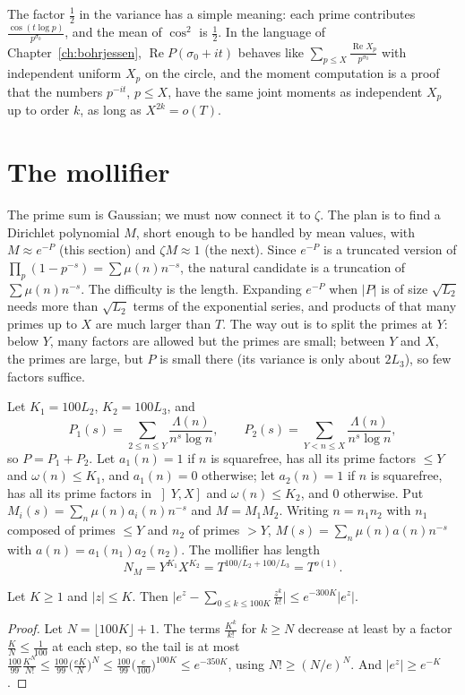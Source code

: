 The factor $\frac12$ in the variance has a simple meaning: each prime contributes $\frac{\cos(t\log p)}{p^{\sigma_0}}$, and the mean of $\cos^2$ is $\frac12$. In the language of Chapter~\ref{ch:bohrjessen}, $\operatorname{Re}P(\sigma_0+it)$ behaves like $\sum_{p\le X}\frac{\operatorname{Re}X_p}{p^{\sigma_0}}$ with independent uniform $X_p$ on the circle, and the moment computation is a proof that the numbers $p^{-it}$, $p\le X$, have the same joint moments as independent $X_p$ up to order $k$, as long as $X^{2k}=o(T)$.

\section{The mollifier}

The prime sum is Gaussian; we must now connect it to $\zeta$. The plan is to find a Dirichlet polynomial $M$, short enough to be handled by mean values, with $M\approx e^{-P}$ (this section) and $\zeta M\approx1$ (the next). Since $e^{-P}$ is a truncated version of $\prod_p(1-p^{-s})=\sum\mu(n)n^{-s}$, the natural candidate is a truncation of $\sum\mu(n)n^{-s}$. The difficulty is the length. Expanding $e^{-P}$ when $|P|$ is of size $\sqrt{L_2}$ needs more than $\sqrt{L_2}$ terms of the exponential series, and products of that many primes up to $X$ are much larger than $T$. The way out is to split the primes at $Y$: below $Y$, many factors are allowed but the primes are small; between $Y$ and $X$, the primes are large, but $P$ is small there (its variance is only about $2L_3$), so few factors suffice.

Let $K_1=100L_2$, $K_2=100L_3$, and
\[
P_1(s)=\sum_{2\le n\le Y}\frac{\Lambda(n)}{n^s\log n},\qquad P_2(s)=\sum_{Y<n\le X}\frac{\Lambda(n)}{n^s\log n},
\]
so $P=P_1+P_2$. Let $a_1(n)=1$ if $n$ is squarefree, has all its prime factors $\le Y$ and $\omega(n)\le K_1$, and $a_1(n)=0$ otherwise; let $a_2(n)=1$ if $n$ is squarefree, has all its prime factors in $\left]Y,X\right]$ and $\omega(n)\le K_2$, and $0$ otherwise. Put $M_i(s)=\sum_n\mu(n)a_i(n)n^{-s}$ and $M=M_1M_2$. Writing $n=n_1n_2$ with $n_1$ composed of primes $\le Y$ and $n_2$ of primes $>Y$, $M(s)=\sum_n\mu(n)a(n)n^{-s}$ with $a(n)=a_1(n_1)a_2(n_2)$. The mollifier has length
\[
N_M=Y^{K_1}X^{K_2}=T^{100/L_2+100/L_3}=T^{o(1)}.
\]

\begin{lemma}\label{lem:truncexp}
Let $K\ge1$ and $|z|\le K$. Then $\bigl|e^z-\sum_{0\le k\le100K}\frac{z^k}{k!}\bigr|\le e^{-300K}|e^z|$.
\end{lemma}
\begin{proof}
Let $N=\lfloor100K\rfloor+1$. The terms $\frac{K^k}{k!}$ for $k\ge N$ decrease at least by a factor $\frac KN\le\frac1{100}$ at each step, so the tail is at most $\frac{100}{99}\frac{K^N}{N!}\le\frac{100}{99}\bigl(\frac{eK}N\bigr)^N\le\frac{100}{99}\bigl(\frac e{100}\bigr)^{100K}\le e^{-350K}$, using $N!\ge(N/e)^N$. And $|e^z|\ge e^{-K}$.
\end{proof}

